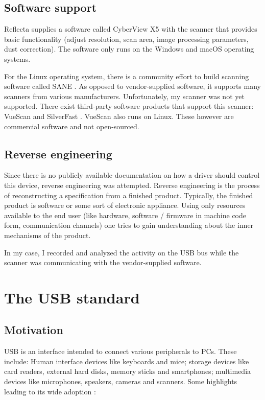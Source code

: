 \documentclass{article}
\begin{document}
\subsection{Software support}

Reflecta supplies a software called CyberView X5 with the scanner that
provides basic functionality (adjust resolution, scan area, image processing parameters, dust correction).
The software only runs on the Windows and macOS operating systems.

For the Linux operating system, there is a community effort to build scanning software
called SANE \cite{saneproject}. As opposed to vendor-supplied software, it supports many scanners
from various manufacturers. Unfortunately, my scanner was not yet supported.
There exist third-party software products that support this scanner: VueScan \cite{vuescan}
and SilverFast \cite{silverfast}. VueScan also runs on Linux. These however are commercial software
and not open-sourced.

\subsection{Reverse engineering}

Since there is no publicly available documentation on how a driver should control this
device, reverse engineering was attempted.
Reverse engineering is the process of reconstructing a specification from a finished
product. Typically, the finished product is software or some sort of electronic
appliance.
Using only resources available to the end user (like hardware,
software / firmware in machine code form, communication channels)
one tries to gain understanding about the inner mechanisms of the product.

In my case, I recorded and analyzed the activity on the USB bus while the scanner
was communicating with the vendor-supplied software.

\section{The USB standard}

\subsection{Motivation}

USB is an interface intended to connect various peripherals to PCs. These include:
Human interface devices like keyboards and mice; storage devices like card readers,
external hard disks, memory sticks and smartphones; multimedia devices like microphones, speakers,
cameras and scanners. Some highlights leading to its wide adoption \cite[p. 11]{usbstd}:
\end{document}
